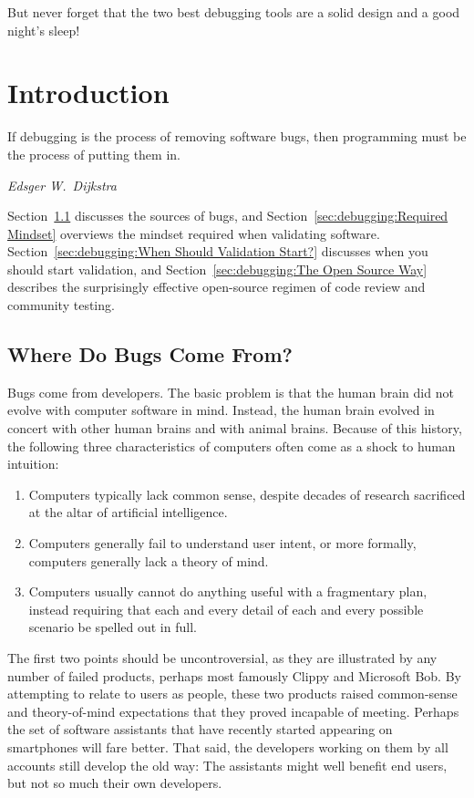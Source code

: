 But never forget that the two best debugging tools are a solid design
and a good night's sleep!

\section{Introduction}
\label{sec:debugging:Introduction}
%
\epigraph{If debugging is the process of removing software bugs, then
	  programming must be the process of putting them in.}
	 {\emph{Edsger W.~Dijkstra}}

Section~\ref{sec:debugging:Where Do Bugs Come From?}
discusses the sources of bugs, and
Section~\ref{sec:debugging:Required Mindset}
overviews the mindset required when validating software.
Section~\ref{sec:debugging:When Should Validation Start?}
discusses when you should start validation, and
Section~\ref{sec:debugging:The Open Source Way} describes the
surprisingly effective open-source regimen of code review and
community testing.

\subsection{Where Do Bugs Come From?}
\label{sec:debugging:Where Do Bugs Come From?}

Bugs come from developers.
The basic problem is that the human brain did not evolve with computer
software in mind.
Instead, the human brain evolved in concert with other human brains and
with animal brains.
Because of this history, the following three characteristics of computers
often come as a shock to human intuition:

\begin{enumerate}
\item	Computers typically lack common sense, despite decades of research
	sacrificed at the altar of artificial intelligence.
\item	Computers generally fail to understand user intent, or more
	formally, computers generally lack a theory of mind.
\item	Computers usually cannot do anything useful with a fragmentary plan,
	instead requiring that each and every detail of each and every
	possible scenario be spelled out in full.
\end{enumerate}

The first two points should be uncontroversial, as they are illustrated
by any number of failed products, perhaps most famously Clippy and
Microsoft Bob.
By attempting to relate to users as people, these two products raised
common-sense and theory-of-mind expectations that they proved incapable
of meeting.
Perhaps the set of software assistants that have recently started appearing
on smartphones will fare better.
That said, the developers working on them by all accounts still develop
the old way: The assistants might well benefit end users, but not so
much their own developers.

